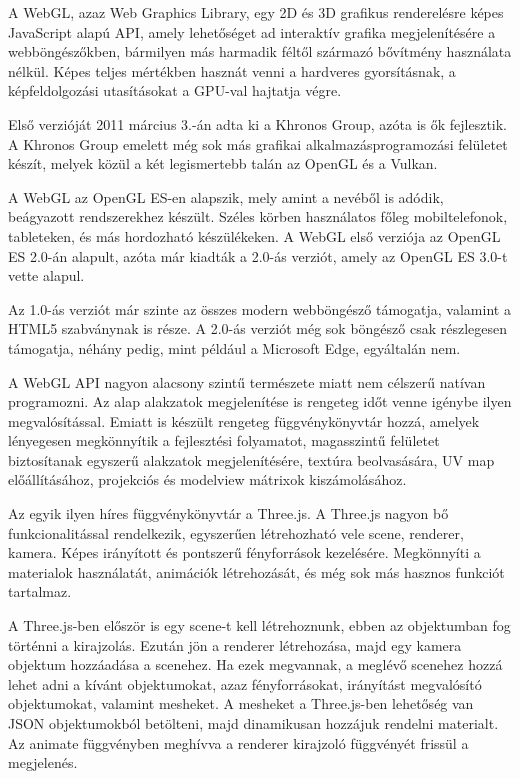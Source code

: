 
A WebGL, azaz Web Graphics Library, egy 2D és 3D grafikus renderelésre képes JavaScript alapú API, amely lehetőséget ad interaktív grafika megjelenítésére a webböngészőkben, bármilyen más harmadik féltől származó bővítmény használata nélkül. Képes teljes mértékben hasznát venni a hardveres gyorsításnak, a képfeldolgozási utasításokat a GPU-val hajtatja végre. 

Első verzióját 2011 március 3.-án adta ki a Khronos Group, azóta is ők fejlesztik. A Khronos Group emelett még sok más grafikai alkalmazásprogramozási felületet készít, melyek közül a két legismertebb talán az OpenGL és a Vulkan.

A WebGL az OpenGL ES-en alapszik, mely amint a nevéből is adódik, beágyazott rendszerekhez készült. Széles körben használatos főleg mobiltelefonok, tableteken, és más hordozható készülékeken. A WebGL első verziója az OpenGL ES 2.0-án alapult, azóta már kiadták a 2.0-ás verziót, amely az OpenGL ES 3.0-t vette alapul.

Az 1.0-ás verziót már szinte az összes modern webböngésző támogatja, valamint a HTML5 szabványnak is része. A 2.0-ás verziót még sok böngésző csak részlegesen támogatja, néhány pedig, mint például a Microsoft Edge, egyáltalán nem.

A WebGL API nagyon alacsony szintű természete miatt nem célszerű natívan programozni. Az alap alakzatok megjelenítése is rengeteg időt venne igénybe ilyen megvalósítással. Emiatt is készült rengeteg függvénykönyvtár hozzá, amelyek lényegesen megkönnyítik a fejlesztési folyamatot, magasszintű felületet biztosítanak egyszerű alakzatok megjelenítésére, textúra beolvasására, UV map előállításához, projekciós és modelview mátrixok kiszámolásához.

Az egyik ilyen híres függvénykönyvtár a Three.js. A Three.js nagyon bő funkcionalitással rendelkezik, egyszerűen létrehozható vele scene, renderer, kamera. Képes irányított és pontszerű fényforrások kezelésére. Megkönnyíti a materialok használatát, animációk létrehozását, és még sok más hasznos funkciót tartalmaz.

A Three.js-ben először is egy scene-t kell létrehoznunk, ebben az objektumban fog történni a kirajzolás. Ezután jön a renderer létrehozása, majd egy kamera objektum hozzáadása a scenehez. Ha ezek megvannak, a meglévő scenehez hozzá lehet adni a kívánt objektumokat, azaz fényforrásokat, irányítást megvalósító objektumokat, valamint mesheket. A mesheket a Three.js-ben lehetőség van JSON objektumokból betölteni, majd dinamikusan hozzájuk rendelni materialt. Az animate függvényben meghívva a renderer kirajzoló függvényét frissül a megjelenés.


